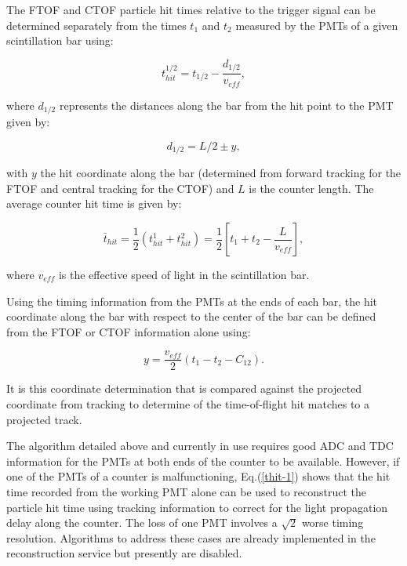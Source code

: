 The FTOF and CTOF particle hit times relative to the trigger signal can be determined separately from the times
$t_1$ and $t_2$ measured by the PMTs of a given scintillation bar using:

\begin{equation}
\label{thit-1}
t_{hit}^{1/2} = t_{1/2} - \frac{d_{1/2}}{v_{eff}},
\end{equation}

\noindent
where $d_{1/2}$ represents the distances along the bar from the hit point to the PMT given by:

\begin{equation}
d_{1/2}= L/2 \pm y,
\end{equation}

\noindent
with $y$ the hit coordinate along the bar (determined from forward tracking for the FTOF and central tracking
for the CTOF) and $L$ is the counter length. The average counter hit time is given by:

\begin{equation}
\label{thit-2}
\bar{t}_{hit} = \frac{1}{2} ( t_{hit}^1 + t_{hit}^2 ) = \frac{1}{2} \left[ t_1 + t_2 - \frac{L}{v_{eff}} \right],
\end{equation}

\noindent
where $v_{eff}$ is the effective speed of light in the scintillation bar.

Using the timing information from the PMTs at the ends of each bar, the hit coordinate along the bar with respect
to the center of the bar can be defined from the FTOF or CTOF information alone using:

\begin{equation}
\label{tof-coor}
y = \frac{v_{eff}}{2} (t_1 - t_2 - C_{12}).
\end{equation}

\noindent
It is this coordinate determination that is compared against the projected coordinate from tracking to
determine of the time-of-flight hit matches to a projected track.

The algorithm detailed above and currently in use requires good ADC and TDC information for the PMTs at both
ends of the counter to be available. However, if one of the PMTs of a counter is malfunctioning, Eq.(\ref{thit-1})
shows that the hit time recorded from the working PMT alone can be used to reconstruct the particle hit time using
tracking information to correct for the light propagation delay along the counter. The loss of one PMT involves a
$\sqrt{2}$ worse timing resolution. Algorithms to address these cases are already implemented in the reconstruction
service but presently are disabled.

